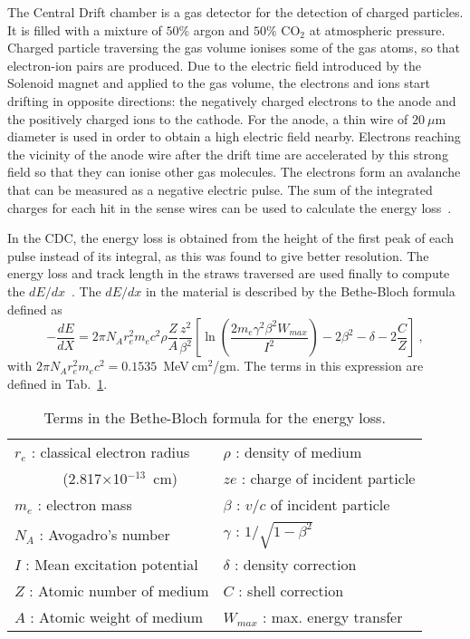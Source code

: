 The Central Drift chamber is a gas detector for the detection of charged particles. It is filled with a mixture of $50\%$ argon and $50\%$ CO$_{2}$ at atmospheric pressure. Charged particle traversing the gas volume ionises some of the gas atoms, so that electron-ion pairs are produced. Due to the electric field introduced by the Solenoid magnet and applied to the gas volume, the electrons and ions start drifting in opposite directions: the negatively charged electrons to the anode and the positively charged ions to the cathode. For the anode, a thin wire of $20~\mu$m diameter is used in order to obtain a high electric field nearby. Electrons reaching the vicinity of the anode wire after the drift time are accelerated by this strong field so that they can ionise other gas molecules. The electrons form an avalanche that can be measured as a negative electric pulse. The sum of the integrated charges for each hit in the sense wires can be used to calculate the energy loss~\cite{34}.
~\par In the CDC, the energy loss is obtained from the height of the first peak of each pulse instead of its integral, as this was found to give better resolution. The energy loss and track length in the straws traversed are used finally to compute the $dE/dx$~\cite{35}.
The $dE/dx$ in the material is described by the Bethe-Bloch formula~\cite{36} defined as
\begin{equation}
    \label{eq.3.1}
    -\frac{dE}{dX} = 2 \pi N_A r_e^2 m_e c^2 \rho \frac{Z}{A} \frac{z^2}{\beta^2} \left [ \ln \left( \frac{2 m_e \gamma^2 \beta^2 W_{max}}{I^2} \right) - 2 \beta^2 - \delta - 2\frac{C}{Z} \right]~,
\end{equation}
with $2 \pi N_A r_e^2 m_e c^2 = 0.1535$~MeV$~\!$cm$^2$/gm. The terms in this expression are defined in Tab.~\ref{tab.3.1}.
\begin{table}[b]
    \begin{center}
        \caption{\small{Terms in the Bethe-Bloch formula for the energy loss.}}
        \label{tab.3.1}
        \begin{tabular} {||l||l||} \hline
            $r_e$ : classical electron radius   & $\rho$ : density of medium \\
            ~~~~~~ (2.817$\times$10$^{-13}$~cm) & $ze$ : charge of incident particle \\
            $m_e$ : electron mass               & $\beta$ : $v/c$ of incident particle \\
            $N_A$ : Avogadro's number           & $\gamma$ : $1/\sqrt{1 - \beta^2}$ \\
            $I$  : Mean excitation potential    & $\delta$ : density correction \\
            $Z$ : Atomic number of medium       & $C$ : shell correction \\
            $A$ : Atomic weight of medium       & $W_{max}$ : max. energy transfer \\ \hline
        \end{tabular}
    \end{center}
\end{table}
